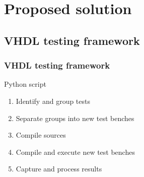 \documentclass[british,10pt]{beamer}
\begin{document}
%


\section{Proposed solution}
\subsection{VHDL testing framework}

\begin{frame}\frametitle{VHDL testing framework}
Python script
\begin{enumerate}
\item Identify and group tests
\item Separate groups into new test benches
\item Compile sources
\item Compile and execute new test benches
\item Capture and process results
\end{enumerate}
\end{frame}
\end{document}
